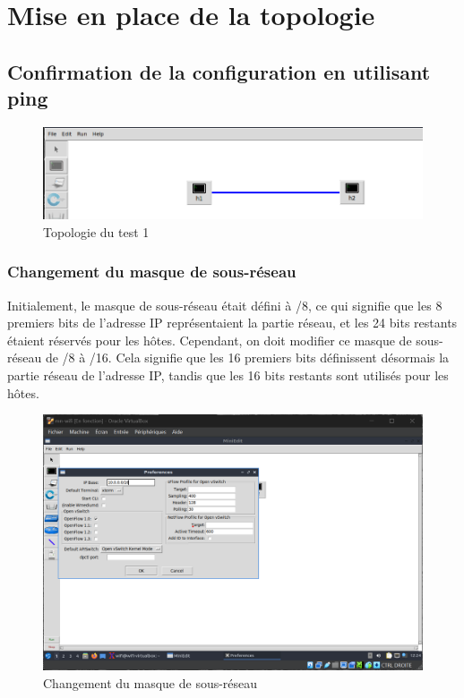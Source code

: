 \section{Mise en place de la topologie} 
\vspace{0.3cm}

\subsection{Confirmation de la configuration en utilisant ping}
\begin{figure}[h]
    \centering
    \includegraphics[width=1\textwidth]{./images/topology.png} 
    \caption{Topologie du test 1}
    \label{fig:exemple}
\end{figure}

\subsubsection{Changement du masque de sous-réseau}
\vspace{0.3cm}
Initialement, le masque de sous-réseau était défini à /8, ce qui signifie que les 8 premiers bits de l'adresse IP représentaient la partie réseau, et les 24 bits restants étaient réservés pour les hôtes.
Cependant, on doit modifier ce masque de sous-réseau de /8 à /16. Cela signifie que les 16 premiers bits définissent désormais la partie réseau de l’adresse IP, tandis que les 16 bits restants sont utilisés pour les hôtes.

\begin{figure}[h]
    \centering
    \includegraphics[width=1\textwidth]{./images/IpBaseSetup.png} 
    \caption{Changement du masque de sous-réseau}
    \label{fig:exemple}
\end{figure}


